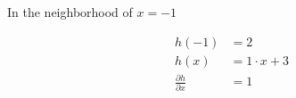 
In the neighborhood of $x = -1$

\begin{align*}
    h(-1) &= 2 \\
    h(x) &= 1 \cdot x + 3\\
    \frac{\partial h}{\partial x} &= 1
\end{align*}
